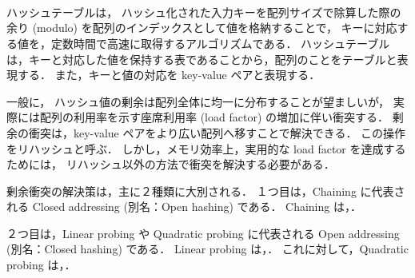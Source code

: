 \thispagestyle{empty} %

　\\
\\
\\
\\
\\
\\
\\
\\

ハッシュテーブルは，
ハッシュ化された入力キーを配列サイズで除算した際の余り (modulo) を配列のインデックスとして値を格納することで，
キーに対応する値を，定数時間で高速に取得するアルゴリズムである．
ハッシュテーブルは，キーと対応した値を保持する表であることから，配列のことをテーブルと表現する．
また，キーと値の対応を key-value ペアと表現する．

一般に，
ハッシュ値の剰余は配列全体に均一に分布することが望ましいが，
実際には配列の利用率を示す座席利用率 (load factor) の増加に伴い衝突する．
剰余の衝突は，key-value ペアをより広い配列へ移すことで解決できる．
この操作をリハッシュと呼ぶ．
しかし，メモリ効率上，実用的な load factor を達成するためには，
リハッシュ以外の方法で衝突を解決する必要がある．

剰余衝突の解決策は，主に２種類に大別される．
１つ目は，Chaining に代表される Closed addressing (別名：Open hashing) である．
Chaining は，．

２つ目は，Linear probing や Quadratic probing に代表される Open addressing (別名：Closed hashing) である．
Linear probing は，．
これに対して，Quadratic probing は，．




